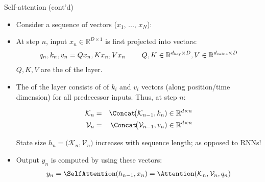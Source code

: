 \begin{frame}{Self-attention (cont'd)}
\begin{itemize}
\item Consider a sequence of vectors ($x_1$, ..., $x_N$):
\pause
\item At step $n$, input $x_n \in \mathbb{R}^{D \times 1}$ is first projected into  vectors:
   \begin{eqnarray*}
q_n, k_n, v_n = Qx_n, Kx_n, Vx_n \text{\hspace{8mm}} Q,K \in \mathbb{R}^{d_{\text{key}} \times D}, V \in \mathbb{R}^{d_{\text{value}} \times D}
    \end{eqnarray*}
$Q,K,V$ are the  of the layer.
\pause
\item The  of the layer consists of  of $k_i$ and $v_i$ vectors (along position/time dimension)
for all predecessor inputs. Thus, at step $n$:

\begin{eqnarray*}
\mathcal{K}_n &=& \Concat\!\big(\mathcal{K}_{n-1}, k_n) \in \mathbb{R}^{d \times n} \\
\mathcal{V}_n &=& \Concat\!\big(\mathcal{V}_{n-1}, v_n) \in \mathbb{R}^{d \times n} \\
\end{eqnarray*}


\pause
State size $h_n = \big(\mathcal{K}_n, \mathcal{V}_n\big)$ increases with sequence length; as opposed to RNNs!
\pause
\item Output $y_n $ is computed by  using these vectors:
   \begin{eqnarray*}
y_n = \SelfAttention(h_{n-1},x_n) = \Attention(\mathcal{K}_n, \mathcal{V}_n, q_n)
    \end{eqnarray*}
\end{itemize}
\end{frame}

